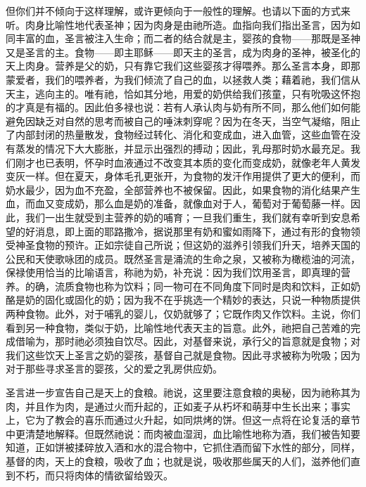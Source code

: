 但你们并不倾向于这样理解，或许更倾向于一般性的理解。也请以下面的方式来听。肉身比喻性地代表圣神；因为肉身是由祂所造。血指向我们指出圣言，因为如同丰富的血，圣言被注入生命；而二者的结合就是主，婴孩的食物——那既是圣神又是圣言的主。食物——即主耶稣——即天主的圣言，成为肉身的圣神，被圣化的天上肉身。营养是父的奶，只有靠它我们这些婴孩才得喂养。那么圣言本身，即那蒙爱者，我们的喂养者，为我们倾流了自己的血，以拯救人类；藉着祂，我们信从天主，逃向主的。唯有祂，恰如其分地，用爱的奶供给我们孩童，只有吮吸这怀抱的才真是有福的。因此伯多禄也说：若有人承认肉与奶有所不同，那么他们如何能避免因缺乏对自然的思考而被自己的唾沫刺穿呢？因为在冬天，当空气凝缩，阻止了内部封闭的热量散发，食物经过转化、消化和变成血，进入血管，这些血管在没有蒸发的情况下大大膨胀，并显示出强烈的搏动；因此，乳母那时奶水最充足。我们刚才也已表明，怀孕时血液通过不改变其本质的变化而变成奶，就像老年人黄发变灰一样。但在夏天，身体毛孔更张开，为食物的发汗作用提供了更大的便利，而奶水最少，因为血不充盈，全部营养也不被保留。因此，如果食物的消化结果产生血，而血又变成奶，那么血是奶的准备，就像血对于人，葡萄对于葡萄藤一样。因此，我们一出生就受到主营养的奶的哺育；一旦我们重生，我们就有幸听到安息希望的好消息，即上面的耶路撒冷，据说那里有奶和蜜如雨降下，通过有形的食物领受神圣食物的预许。正如宗徒自己所说；但这奶的滋养引领我们升天，培养天国的公民和天使歌咏团的成员。既然圣言是涌流的生命之泉，又被称为橄榄油的河流，保禄使用恰当的比喻语言，称祂为奶，补充说：因为我们饮用圣言，即真理的营养。的确，流质食物也称为饮料；同一物可在不同角度下同时是肉和饮料，正如奶酪是奶的固化或固化的奶；因为我不在乎挑选一个精妙的表达，只说一种物质提供两种食物。此外，对于哺乳的婴儿，仅奶就够了；它既作肉又作饮料。主说，你们看到另一种食物，类似于奶，比喻性地代表天主的旨意。此外，祂把自己苦难的完成借喻为，那时祂必须独自饮尽。因此，对基督来说，承行父的旨意就是食物；对我们这些饮天上圣言之奶的婴孩，基督自己就是食物。因此寻求被称为吮吸；因为对于那些寻求圣言的婴孩，父的爱之乳房供应奶。\par

圣言进一步宣告自己是天上的食粮。祂说，这里要注意食粮的奥秘，因为祂称其为肉，并且作为肉，是通过火而升起的，正如麦子从朽坏和萌芽中生长出来；事实上，它为了教会的喜乐而通过火升起，如同烘烤的饼。但这一点将在论复活的章节中更清楚地解释。但既然祂说：而肉被血湿润，血比喻性地称为酒，我们被告知要知道，正如饼被揉碎放入酒和水的混合物中，它抓住酒而留下水性的部分，同样，基督的肉，天上的食粮，吸收了血；也就是说，吸收那些属天的人们，滋养他们直到不朽，而只将肉体的情欲留给毁灭。\par

